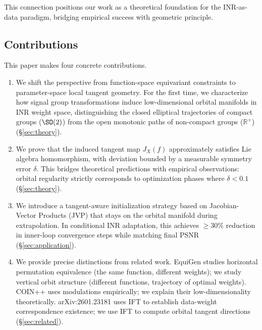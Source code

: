This connection positions our work as a theoretical foundation for the INR-as-data paradigm, bridging empirical success with geometric principle.

\subsection{Contributions}

This paper makes four concrete contributions.

\begin{enumerate}
    \item We shift the perspective from function-space equivariant constraints to parameter-space local tangent geometry.
    For the first time, we characterize how signal group transformations induce low-dimensional orbital manifolds in INR weight space, distinguishing the closed elliptical trajectories of compact groups ($\SO(2)$) from the open monotonic paths of non-compact groups ($\mathbb{R}^+$) (\S\ref{sec:theory}).

    \item We prove that the induced tangent map $J_X(f)$ approximately satisfies Lie algebra homomorphism, with deviation bounded by a measurable symmetry error $\delta$.
    This bridges theoretical predictions with empirical observations: orbital regularity strictly corresponds to optimization phases where $\delta < 0.1$ (\S\ref{sec:theory}).

    \item We introduce a tangent-aware initialization strategy based on Jacobian-Vector Products (JVP) that stays on the orbital manifold during extrapolation.
    In conditional INR adaptation, this achieves $\ge 30\%$ reduction in inner-loop convergence steps while matching final PSNR (\S\ref{sec:application}).

    \item We provide precise distinctions from related work.
    EquiGen studies horizontal permutation equivalence (the same function, different weights);
    we study vertical orbit structure (different functions, trajectory of optimal weights).
    COIN++ uses modulations empirically; we explain their low-dimensionality theoretically.
    arXiv:2601.23181 uses IFT to establish data-weight correspondence existence; we use IFT to compute orbital tangent directions (\S\ref{sec:related}).
\end{enumerate}
